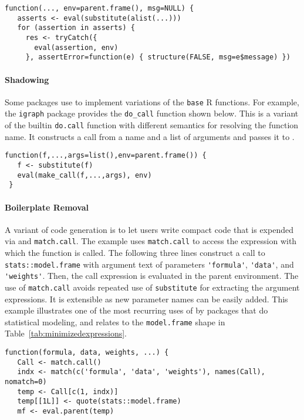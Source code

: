 \documentclass[acmsmall, screen]{acmart}
\renewcommand{\k}[1]{\lstinline |#1|\xspace}
\begin{document}
\begin{lstlisting}[caption={\k{assertthat::see\_if}}, captionpos=b]
 function(..., env=parent.frame(), msg=NULL) {
   asserts <- eval(substitute(alist(...)))
   for (assertion in asserts) {
     res <- tryCatch({
       eval(assertion, env)
     }, assertError=function(e) { structure(FALSE, msg=e$message) })
\end{lstlisting}\medskip

\paragraph{Shadowing}
Some packages use \eval to implement variations of the \k{base} R functions. For
example, the \k{igraph} package provides the \k{do_call} function shown below.
This is a variant of the builtin \k{do.call} function with different semantics
for resolving the function name. It constructs a call from a name and a list of
arguments and passes it to \eval.

\begin{lstlisting}[caption={\k{igraph::do\_call}}, captionpos=b]
 function(f,...,args=list(),env=parent.frame()) {
   f <- substitute(f)
   eval(make_call(f,...,args), env)
 }
\end{lstlisting}\medskip

\paragraph{Boilerplate Removal}
A variant of code generation is to let users write compact code that is expended
via \eval and \k{match.call}. The example uses \k{match.call} to access the
expression with which the function is called. The following three lines construct a
call to \k{stats::model.frame} with argument text of parameters \k{'formula'},
\k{'data'}, and \k{'weights'}. Then, the call expression is evaluated in the
parent environment. The use of \k{match.call} avoids repeated use of
\k{substitute} for extracting the argument expressions. It is extensible as new
parameter names can be easily added. This example illustrates one of the most
recurring uses of \eval by packages that do statistical modeling, and relates to
the \k{model.frame} shape in Table~\ref{tab:minimizedexpressions}.

\begin{lstlisting}[caption={\k{survival::survfit.formula}}, captionpos=b]
 function(formula, data, weights, ...) {
   Call <- match.call()
   indx <- match(c('formula', 'data', 'weights'), names(Call), nomatch=0)
   temp <- Call[c(1, indx)]
   temp[[1L]] <- quote(stats::model.frame)
   mf <- eval.parent(temp)
\end{lstlisting}\medskip
\end{document}
